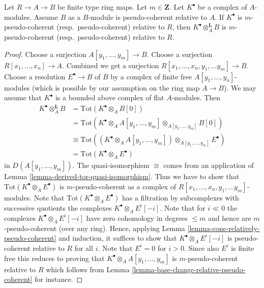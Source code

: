 \begin{lemma}
\label{lemma-pull-relative-pseudo-coherent}
Let $R \to A \to B$ be finite type ring maps.
Let $m \in \mathbf{Z}$.
Let $K^\bullet$ be a complex of $A$-modules.
Assume $B$ as a $B$-module is pseudo-coherent relative to $A$.
If $K^\bullet$ is $m$-pseudo-coherent (resp.\ pseudo-coherent)
relative to $R$, then $K^\bullet \otimes_A^{\mathbf{L}} B$ is
$m$-pseudo-coherent (resp.\ pseudo-coherent) relative to $R$.
\end{lemma}

\begin{proof}
Choose a surjection $A[y_1, \ldots, y_m] \to B$.
Choose a surjection $R[x_1, \ldots, x_n] \to A$.
Combined we get a surjection $R[x_1, \ldots, x_n, y_1, \ldots y_m] \to B$.
Choose a resolution $E^\bullet \to B$ of $B$ by a complex of
finite free $A[y_1, \ldots, y_n]$-modules (which is possible
by our assumption on the ring map $A \to B$). We may assume
that $K^\bullet$ is a bounded above complex of flat $A$-modules. Then
\begin{align*}
K^\bullet \otimes_A^{\mathbf{L}} B & =
\text{Tot}(K^\bullet \otimes_A B[0]) \\
& = \text{Tot}(K^\bullet \otimes_A A[y_1, \ldots, y_m]
\otimes_{A[y_1, \ldots, y_m]} B[0]) \\
& \cong
\text{Tot}\left(
(K^\bullet \otimes_A A[y_1, \ldots, y_m])
\otimes_{A[y_1, \ldots, y_m]} E^\bullet
\right) \\
& =
\text{Tot}(K^\bullet \otimes_A E^\bullet)
\end{align*}
in $D(A[y_1, \ldots, y_m])$. The quasi-isomorphism $\cong$ comes from
an application of
Lemma \ref{lemma-derived-tor-quasi-isomorphism}.
Thus we have to show that
$\text{Tot}(K^\bullet \otimes_A E^\bullet)$ is $m$-pseudo-coherent
as a complex of $R[x_1, \ldots, x_n, y_1, \ldots y_m]$-modules.
Note that $\text{Tot}(K^\bullet \otimes_A E^\bullet)$ has a filtration by
subcomplexes with successive quotients the complexes
$K^\bullet \otimes_A E^i[-i]$. Note that for $i \ll 0$ the
complexes $K^\bullet \otimes_A E^i[-i]$ have zero cohomology
in degrees $\leq m$ and hence are $m$-pseudo-coherent (over any ring).
Hence, applying
Lemma \ref{lemma-cone-relatively-pseudo-coherent}
and induction, it suffices to show that $K^\bullet \otimes_A E^i[-i]$ is
pseudo-coherent relative to $R$ for all $i$. Note that $E^i = 0$ for
$i > 0$. Since also $E^i$ is finite free this
reduces to proving that $K^\bullet \otimes_A A[y_1, \ldots, y_m]$ is
$m$-pseudo-coherent relative to $R$ which follows from
Lemma \ref{lemma-base-change-relative-pseudo-coherent}
for instance.
\end{proof}


